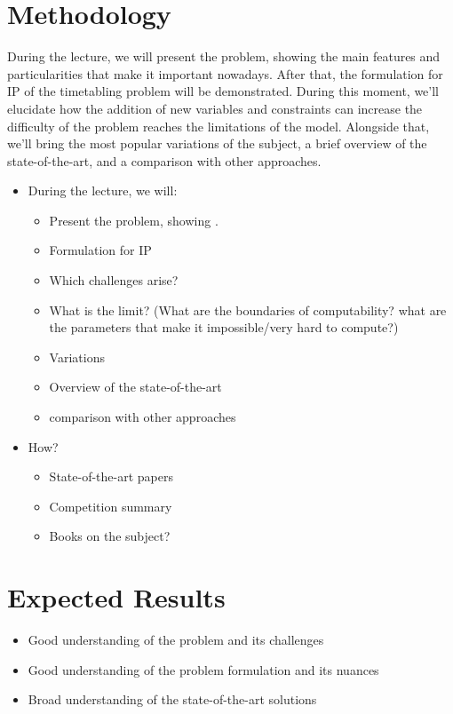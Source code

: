 \documentclass[a4paper]{report}
\begin{document}
\section*{Methodology}

During the lecture, we will present the problem, showing the main features and particularities that make it important nowadays. After that, the formulation for IP of the timetabling problem will be demonstrated. During this moment, we'll elucidate how the addition of new variables and constraints can increase the difficulty of the problem reaches the limitations of the model. Alongside that, we'll bring the most popular variations of the subject, a brief overview of the state-of-the-art, and a comparison with other approaches.

\begin{itemize}
    \item During the lecture, we will:
	\begin{itemize}
	    \item Present the problem, showing .
	    \item Formulation for IP
	    \item Which challenges arise?
	    \item What is the limit? (What are the boundaries of computability? what are the parameters that make it impossible/very hard to compute?)
	    \item Variations
	    \item Overview of the state-of-the-art
	    \item comparison with other approaches
	\end{itemize}
    \item How?
	\begin{itemize}
	    \item State-of-the-art papers
	    \item Competition summary
	    \item Books on the subject?
	\end{itemize}
\end{itemize}

\section*{Expected Results}

\begin{itemize}
    \item Good understanding of the problem and its challenges
    \item Good understanding of the problem formulation and its nuances
    \item Broad understanding of the state-of-the-art solutions
\end{itemize}
\end{document}
